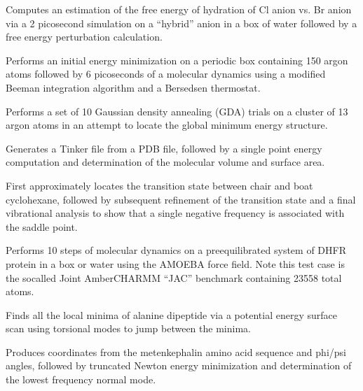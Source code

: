 \documentclass[letterpaper,11pt,english]{sphinxmanual}
\begin{document}

Computes an estimation of the free energy of hydration of Cl\sphinxhyphen{} anion vs. Br\sphinxhyphen{} anion via a 2 picosecond simulation on a “hybrid” anion in a box of water followed by a free energy perturbation calculation.


Performs an initial energy minimization on a periodic box containing 150 argon atoms followed by 6 picoseconds of a molecular dynamics using a modified Beeman integration algorithm and a Bersedsen thermostat.


Performs a set of 10 Gaussian density annealing (GDA) trials on a cluster of 13 argon atoms in an attempt to locate the global minimum energy structure.


Generates a Tinker file from a PDB file, followed by a single point energy computation and determination of the molecular volume and surface area.


First approximately locates the transition state between chair and boat cyclohexane, followed by subsequent refinement of the transition state and a final vibrational analysis to show that a single negative frequency is associated with the saddle point.


Performs 10 steps of molecular dynamics on a pre\sphinxhyphen{}equilibrated system of DHFR protein in a box or water using the AMOEBA force field. Note this test case is the so\sphinxhyphen{}called Joint Amber\sphinxhyphen{}CHARMM “JAC” benchmark containing 23558 total atoms.


Finds all the local minima of alanine dipeptide via a potential energy surface scan using torsional modes to jump between the minima.


Produces coordinates from the met\sphinxhyphen{}enkephalin amino acid sequence and phi/psi angles, followed by truncated Newton energy minimization and determination of the lowest frequency normal mode.

\end{document}

